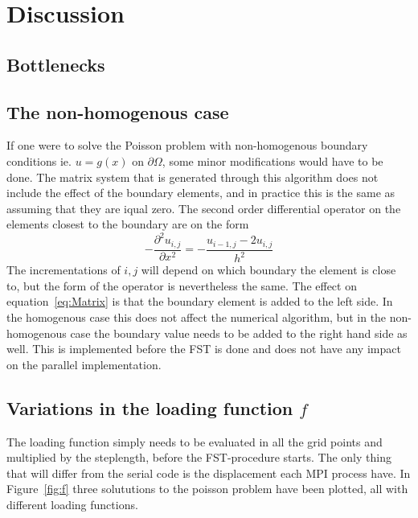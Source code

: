 \section{Discussion}

\subsection{Bottlenecks}

\subsection{The non-homogenous case}
If one were to solve the Poisson problem with non-homogenous boundary conditions ie. $u = g(x) $ on $\partial \Omega$, 
some minor modifications would have to be done. 
The matrix system that is generated through this algorithm does not include the effect of the boundary elements, 
and in practice this is the same as assuming that they are iqual zero. The second order differential operator on the elements 
closest to the boundary are on the form 
\begin{equation}
	-\frac{\partial^2 u_{i,j}}{\partial x^2} = -\frac{u_{i-1,j}-2u_{i,j}}{h^2}
\end{equation}
The incrementations of $i,j$ will depend on which boundary the element is close to, but the form of the operator is nevertheless the same.
The effect on equation~\ref{eq:Matrix} is that the boundary element is added to the left side.
In the homogenous case this does not affect the numerical algorithm, but in the non-homogenous case the boundary value needs to be added to the 
right hand side as well. This is implemented before the FST is done and does not have any impact on the parallel implementation. 

\subsection{Variations in the loading function $f$}
The loading function simply needs to be evaluated in all the grid points and multiplied by the steplength, before the 
FST-procedure starts. The only thing that will differ from the serial code is the displacement each MPI process have.
In Figure~\ref{fig:f} three solututions to the poisson problem have been plotted, all with different loading functions. 

